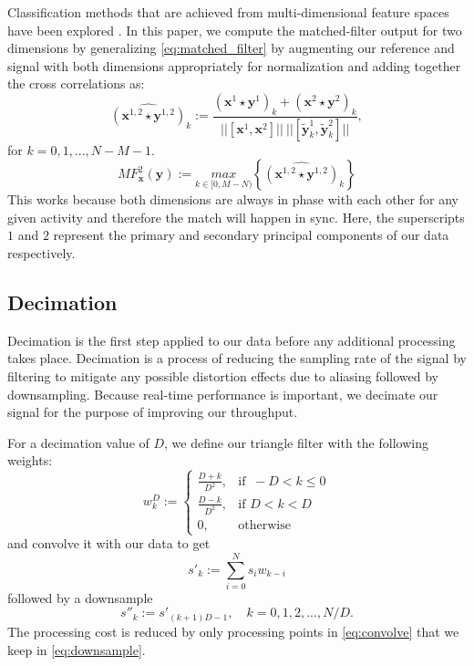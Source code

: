 \documentclass[journal]{IEEEtran}
\begin{document}
Classification methods that are achieved from multi-dimensional feature spaces have been explored \cite{survey_multi_view_machine_learning}.
In this paper, we compute the matched-filter output for two dimensions by generalizing \eqref{eq:matched_filter} by augmenting our reference and signal with both dimensions appropriately for normalization and adding together the cross correlations as:
%
\begin{equation} \label{eq:cross_correlation_2}
\widehat{(\textbf{x}^{1,2} \star \textbf{y}^{1,2})}_k := \frac{(\textbf{x}^1 \star \textbf{y}^1)_k + (\textbf{x}^2 \star \textbf{y}^2)_k}{||[ \textbf{x}^1, \textbf{x}^2 ]|| \ || [ \widetilde{\textbf{y}}_k^1, \widetilde{\textbf{y}}_k^2 ] || },
\end{equation}
%
for $ k = 0,1,...,N-M-1 $. \\
%
\begin{equation} \label{eq:matched_filter_2}
MF_{\textbf{x}}^2(\textbf{y}) := \underset{k \in [0, M-N)}{max} \left \{\widehat{(\textbf{x}^{1,2} \star \textbf{y}^{1,2})}_k \right \}
\end{equation}
%
This works because both dimensions are always in phase with each other for any given activity and therefore the match will happen in sync. Here, the superscripts $1$ and $2$ represent the primary and secondary principal components of our data respectively.
%
\subsection{Decimation}
Decimation is the first step applied to our data before any additional processing takes place.
Decimation is a process of reducing the sampling rate of the signal by filtering to mitigate any possible distortion effects due to aliasing followed by downsampling.
Because real-time performance is important, we decimate our signal for the purpose of improving our throughput.

For a decimation value of $D$, we define our triangle filter with the following weights:
%
\begin{equation} \label{eq:triangle_filter_weights}
w_k^D :=
\begin{cases}
  \frac{D+k}{D^2}, & \text{if }\ -D < k \leq 0 \\
  \frac{D-k}{D^2}, & \text{if } D < k < D \\
  0, & \text{otherwise}
\end{cases}
\end{equation}
%
and convolve it with our data to get
%
\begin{equation} \label{eq:convolve}
s'_k := \sum_{i=0}^{N} s_i w_{k-i}
\end{equation}
%
followed by a downsample
%
\begin{equation} \label{eq:downsample}
s''_k := s'_{(k+1)D-1}, \quad k = 0, 1, 2, ..., N/D.
\end{equation}
%
The processing cost is reduced by only processing points in \eqref{eq:convolve} that we keep in \eqref{eq:downsample}.
%
\end{document}
